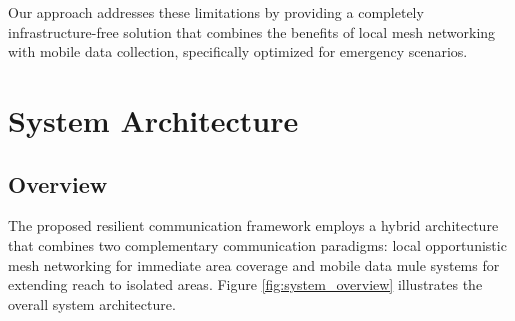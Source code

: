 \documentclass[conference]{IEEEtran}
\begin{document}
Our approach addresses these limitations by providing a completely infrastructure-free solution that combines the benefits of local mesh networking with mobile data collection, specifically optimized for emergency scenarios.

\section{System Architecture}

\subsection{Overview}

The proposed resilient communication framework employs a hybrid architecture that combines two complementary communication paradigms: local opportunistic mesh networking for immediate area coverage and mobile data mule systems for extending reach to isolated areas. Figure \ref{fig:system_overview} illustrates the overall system architecture.
\end{document}
